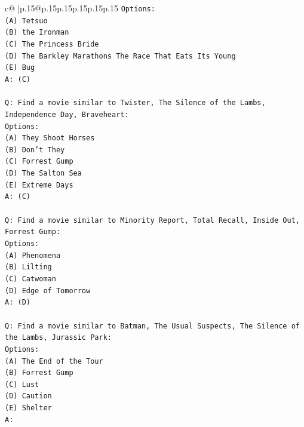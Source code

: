 \documentclass{article}
\begin{document}
{\begin{supertabular}{c@{$\;$}|p{.15\linewidth}@{}p{.15\linewidth}p{.15\linewidth}p{.15\linewidth}p{.15\linewidth}p{.15\linewidth}}
{{{\texttt{Options:} \\
\texttt{(A) Tetsuo} \\
\texttt{(B) the Ironman} \\
\texttt{(C) The Princess Bride} \\
\texttt{(D) The Barkley Marathons The Race That Eats Its Young} \\
\texttt{(E) Bug} \\
\texttt{A: (C)} \\
\\ 
\texttt{Q: Find a movie similar to Twister, The Silence of the Lambs, Independence Day, Braveheart:} \\
\texttt{Options:} \\
\texttt{(A) They Shoot Horses} \\
\texttt{(B) Don't They} \\
\texttt{(C) Forrest Gump} \\
\texttt{(D) The Salton Sea} \\
\texttt{(E) Extreme Days} \\
\texttt{A: (C)} \\
\\ 
\texttt{Q: Find a movie similar to Minority Report, Total Recall, Inside Out, Forrest Gump:} \\
\texttt{Options:} \\
\texttt{(A) Phenomena} \\
\texttt{(B) Lilting} \\
\texttt{(C) Catwoman} \\
\texttt{(D) Edge of Tomorrow} \\
\texttt{A: (D)} \\
\\ 
\texttt{Q: Find a movie similar to Batman, The Usual Suspects, The Silence of the Lambs, Jurassic Park:} \\
\texttt{Options:} \\
\texttt{(A) The End of the Tour} \\
\texttt{(B) Forrest Gump} \\
\texttt{(C) Lust} \\
\texttt{(D) Caution} \\
\texttt{(E) Shelter} \\
\texttt{A:} \\
            }
        }
    }
     \\ \\


\end{supertabular}}
\end{document}
